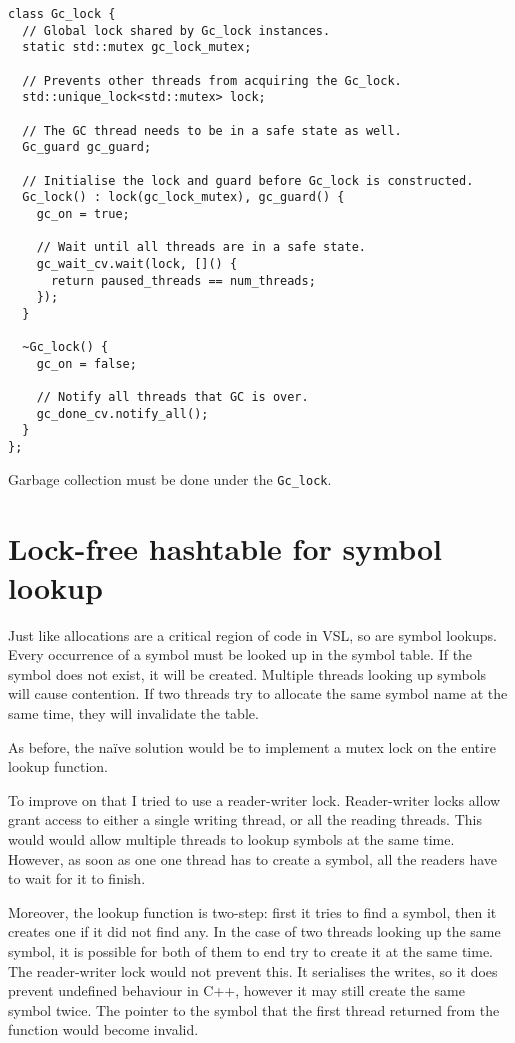 \begin{code}
\begin{verbatim}
class Gc_lock {
  // Global lock shared by Gc_lock instances.
  static std::mutex gc_lock_mutex;

  // Prevents other threads from acquiring the Gc_lock.
  std::unique_lock<std::mutex> lock;

  // The GC thread needs to be in a safe state as well.
  Gc_guard gc_guard;

  // Initialise the lock and guard before Gc_lock is constructed.
  Gc_lock() : lock(gc_lock_mutex), gc_guard() {
    gc_on = true;

    // Wait until all threads are in a safe state.
    gc_wait_cv.wait(lock, []() {
      return paused_threads == num_threads;
    });
  }

  ~Gc_lock() {
    gc_on = false;

    // Notify all threads that GC is over.
    gc_done_cv.notify_all();
  }
};
\end{verbatim}
\caption{Garbage collection must be done under the \texttt{Gc\_lock}.}
\label{code:gc-lock}
\end{code}

\section{Lock-free hashtable for symbol lookup}
\label{sec:hashtable}
Just like allocations are a critical region of code in VSL, so are symbol lookups.
Every occurrence of a symbol must be looked up in the symbol table. If the symbol does
not exist, it will be created. Multiple threads looking up symbols will cause contention.
If two threads try to allocate the same symbol name at the same time, they will invalidate
the table.

As before, the na\"ive solution would be to implement a mutex lock on the entire
lookup function.

To improve on that I tried to use a reader-writer lock. Reader-writer locks allow grant access
to either a single writing thread, or all the reading threads. This would would allow multiple
threads to lookup symbols at the same time. However, as soon as one one thread has to create a
symbol, all the readers have to wait for it to finish.

Moreover, the lookup function is two-step: first it tries to find a symbol, then it creates one
if it did not find any. In the case of two threads looking up the same symbol, it is possible for
both of them to end try to create it at the same time. The reader-writer lock would not prevent this.
It serialises the writes, so it does prevent undefined behaviour in C++, however it may
still create the same symbol twice. The pointer to the symbol that the first thread returned from the function
would become invalid.

